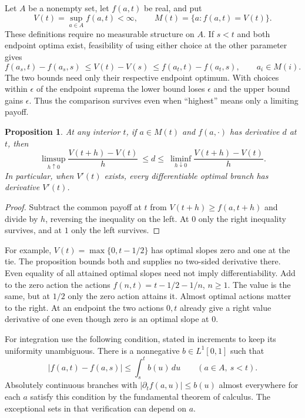 \documentclass[11pt]{article}
\newtheorem{proposition}{Proposition}
\begin{document}
Let $A$ be a nonempty set, let $f(a,t)$ be real, and put
\[
 V(t)=\sup_{a\in A}f(a,t)<\infty,\qquad
 M(t)=\{a:f(a,t)=V(t)\}.
\]
These definitions require no measurable structure on $A$. If $s<t$ and both endpoint optima exist, feasibility of using either choice at the other parameter gives
\begin{equation}\label{eq:bracket}
 f(a_s,t)-f(a_s,s)\ \le V(t)-V(s)\
 \le f(a_t,t)-f(a_t,s),\qquad a_i\in M(i).
\end{equation}
The two bounds need only their respective endpoint optimum. With choices within $\epsilon$ of the endpoint suprema the lower bound loses $\epsilon$ and the upper bound gains $\epsilon$. Thus the comparison survives even when ``highest'' means only a limiting payoff.

\begin{proposition}\label{prop:touch}
At any interior $t$, if $a\in M(t)$ and $f(a,\cdot)$ has derivative $d$ at $t$, then
\[
 \limsup_{h\uparrow0}\frac{V(t+h)-V(t)}h
 \ \le d\le\
 \liminf_{h\downarrow0}\frac{V(t+h)-V(t)}h .
\]
In particular, when $V'(t)$ exists, every differentiable optimal branch has derivative $V'(t)$.
\end{proposition}
\begin{proof}
Subtract the common payoff at $t$ from $V(t+h)\ge f(a,t+h)$ and divide by $h$, reversing the inequality on the left. At $0$ only the right inequality survives, and at $1$ only the left survives.
\end{proof}

For example, $V(t)=\max\{0,t-1/2\}$ has optimal slopes zero and one at the tie. The proposition bounds both and supplies no two-sided derivative there. Even equality of all attained optimal slopes need not imply differentiability. Add to the zero action the actions $f(n,t)=t-1/2-1/n$, $n\ge1$. The value is the same, but at $1/2$ only the zero action attains it. Almost optimal actions matter to the right. At an endpoint the two actions $0,t$ already give a right value derivative of one even though zero is an optimal slope at $0$.

For integration use the following condition, stated in increments to keep its uniformity unambiguous. There is a nonnegative $b\in L^1[0,1]$ such that
\begin{equation}\label{eq:ac}
 |f(a,t)-f(a,s)|\le \int_s^t b(u)\,du
 \qquad(a\in A,\ s<t).
\end{equation}
Absolutely continuous branches with $|\partial_t f(a,u)|\le b(u)$ almost everywhere for each $a$ satisfy this condition by the fundamental theorem of calculus. The exceptional sets in that verification can depend on $a$.
\end{document}
